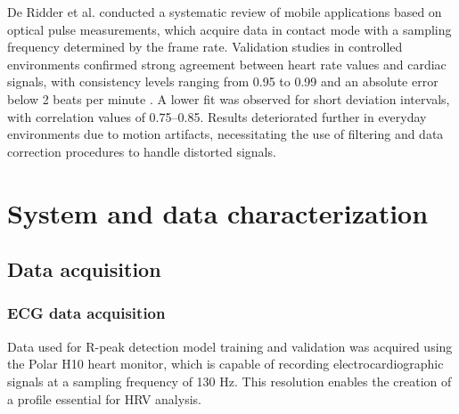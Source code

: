 \documentclass{citask}
\begin{document}
De Ridder et al. \cite{19} conducted a systematic review of mobile applications based on optical pulse measurements, which acquire data in contact mode with a sampling frequency determined by the frame rate. Validation studies in controlled environments confirmed strong agreement between heart rate values and cardiac signals, with consistency levels ranging from 0.95 to 0.99 and an absolute error below 2 beats per minute \cite{20}. A lower fit was observed for short deviation intervals, with correlation values of 0.75–0.85. Results deteriorated further in everyday environments due to motion artifacts, necessitating the use of filtering and data correction procedures to handle distorted signals.


\section{System and data characterization}
\subsection{Data acquisition}
\subsubsection{ECG data acquisition}
Data used for R-peak detection model training and validation was acquired using the Polar H10 heart monitor, which is capable of recording electrocardiographic signals at a sampling frequency of 130 Hz. This resolution enables the creation of a profile essential for HRV analysis.
\end{document}
